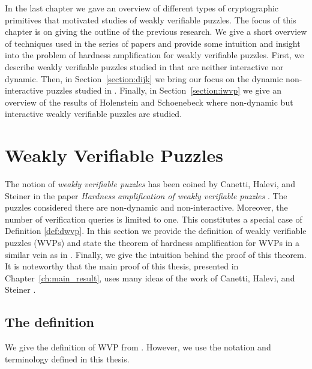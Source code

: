 \label{st:previous_results}
In the last chapter we gave an overview of different types of cryptographic primitives that motivated studies of weakly verifiable puzzles.
The focus of this chapter is on giving the outline of the previous research.
We give a short overview of techniques used in the series of papers \cite{canetti2005hardness, dodis2009security, holenstein2011general}
and provide some intuition and insight into the problem of hardness amplification for weakly verifiable puzzles.
First, we describe weakly verifiable puzzles studied in \cite{canetti2005hardness} that are neither interactive nor dynamic.
Then, in Section~\ref{section:dijk} we bring our focus on the dynamic non-interactive puzzles studied in \cite{dodis2009security}.
Finally, in Section~\ref{section:iwvp} we give an overview of the results of Holenstein and Schoenebeck \cite{holenstein2011general}
where non-dynamic but interactive weakly verifiable puzzles are studied.
%
\section{Weakly Verifiable Puzzles}
\label{subsec:chs}
The notion of \textit{weakly verifiable puzzles} has been coined by Canetti, Halevi, and Steiner in the paper
\textit{Hardness amplification of weakly verifiable puzzles} \cite{canetti2005hardness}.
The puzzles considered there are non-dynamic and non-interactive.
Moreover, the number of verification queries is limited to one. This constitutes a special case of Definition \ref{def:dwvp}.
In this section we provide the definition of weakly verifiable puzzles (WVPs) and state the theorem of hardness amplification for WVPs
in a similar vein as in \cite{canetti2005hardness}.
Finally, we give the intuition behind the proof of this theorem. It is noteworthy that the main proof of this thesis,
presented in Chapter~\ref{ch:main_result}, uses many ideas of the work of Canetti, Halevi, and Steiner \cite{canetti2005hardness}.
%
\subsection{The definition}
We give the definition of WVP from \cite{canetti2005hardness}. However, we use the notation and terminology defined in this thesis.

